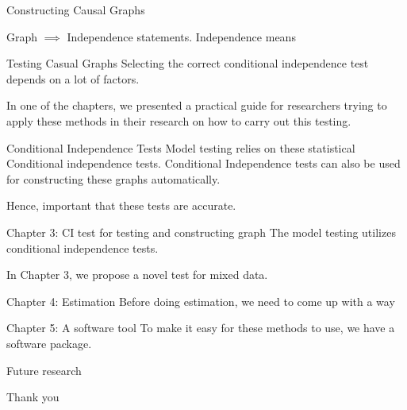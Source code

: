 \documentclass[aspectratio=169]{beamer}
\begin{document}
\begin{frame}{Constructing Causal Graphs}
	
	Graph $ \implies $ Independence statements.
	Independence means 
\end{frame}

\begin{frame}{Testing Casual Graphs}
	Selecting the correct conditional independence test depends on a lot of factors.

	In one of the chapters, we presented a practical guide for researchers trying to apply these methods in their research on how to carry out this testing.
\end{frame}

\begin{frame}{Conditional Independence Tests}
	Model testing relies on these statistical Conditional independence tests.
	Conditional Independence tests can also be used for constructing these graphs
	automatically.

	Hence, important that these tests are accurate.
\end{frame}

\begin{frame}{Chapter 3: CI test for testing and constructing graph}
	The model testing utilizes conditional independence tests.

	In Chapter 3, we propose a novel test for mixed data.
\end{frame}

\begin{frame}{Chapter 4: Estimation}
	Before doing estimation, we need to come up with a way 
\end{frame}

\begin{frame}{Chapter 5: A software tool}
	To make it easy for these methods to use, we have a software package.
\end{frame}

\begin{frame}{Future research}
\end{frame}

\begin{frame}
	\Huge{Thank you}
\end{frame}
\end{document}
